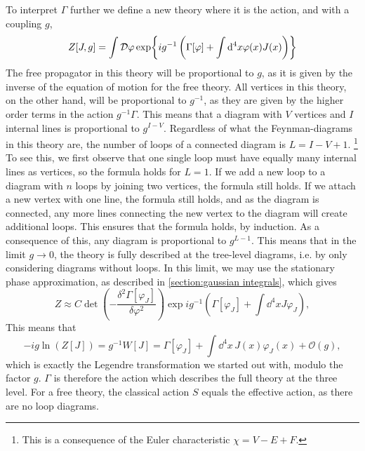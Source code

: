 To interpret $\Gamma$ further we define a new theory where it is the action, and with a coupling $g$, 
\begin{equation}
    \label{partition function with g}
    Z[J, g] = \int \mathcal{D} \varphi 
    \exp{ i g^{-1} \left( \Gamma[\varphi] + \int \dd^4x \varphi(x) J(x) \right) }
\end{equation}
The free propagator in this theory will be proportional to $g$, as it is given by the inverse of the equation of motion for the free theory.
All vertices in this theory, on the other hand, will be proportional to $g^{-1}$, as they are given by the higher order terms in the action $g^{-1}\Gamma$.
This means that a diagram with $V$ vertices and $I$ internal lines is proportional to $g^{I-V}$.
Regardless of what the Feynman-diagrams in this theory are, the number of loops of a connected diagram is $L = I - V + 1$.
\footnote{This is a consequence of the Euler characteristic $\chi = V - E + F$.}
To see this, we first observe that one single loop must have equally many internal lines as vertices, so the formula holds for $L = 1$.
If we add a new loop to a diagram with $n$ loops by joining two vertices, the formula still holds.
If we attach a new vertex with one line, the formula still holds, and as the diagram is connected, any more lines connecting the new vertex to the diagram will create additional loops.
This ensures that the formula holds, by induction.
As a consequence of this, any diagram is proportional to $g^{L-1}$.
This means that in the limit $g \rightarrow 0$, the theory is fully described at the tree-level diagrams, i.e. by only considering diagrams without loops.
In this limit, we may use the stationary phase approximation, as described in \autoref{section:gaussian integrals}, which gives
\begin{equation}
    Z \approx 
    C \det(- \frac{\delta^2 \Gamma[\varphi_J]}{\delta \varphi^2})
    \exp{i g^{-1} \left(\Gamma[\varphi_J] + \int \dd^4x J \varphi_J \right)  },
\end{equation}
This means that
\begin{equation}
    -i g \ln(Z[J]) 
    = g^{-1} W[J] 
    = \Gamma[\varphi_J] + \int \dd^4x\,  J(x) \varphi_J(x) + \mathcal{O}(g),
\end{equation}
which is exactly the Legendre transformation we started out with, modulo the factor $g$.
$\Gamma$ is therefore the action which describes the full theory at the three level.
For a free theory, the classical action $S$ equals the effective action, as there are no loop diagrams.

